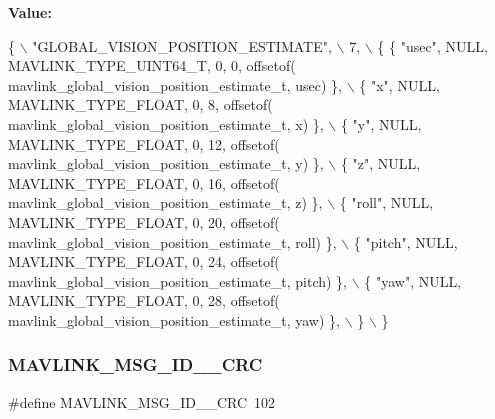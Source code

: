 {\bfseries Value\+:}
\begin{DoxyCode}
\{ \(\backslash\)
    \textcolor{stringliteral}{"GLOBAL\_VISION\_POSITION\_ESTIMATE"}, \(\backslash\)
    7, \(\backslash\)
    \{  \{ \textcolor{stringliteral}{"usec"}, NULL, MAVLINK_TYPE_UINT64_T, 0, 0, offsetof(
      mavlink_global_vision_position_estimate_t, usec) \}, \(\backslash\)
         \{ \textcolor{stringliteral}{"x"}, NULL, MAVLINK_TYPE_FLOAT, 0, 8, offsetof(
      mavlink_global_vision_position_estimate_t, x) \}, \(\backslash\)
         \{ \textcolor{stringliteral}{"y"}, NULL, MAVLINK_TYPE_FLOAT, 0, 12, offsetof(
      mavlink_global_vision_position_estimate_t, y) \}, \(\backslash\)
         \{ \textcolor{stringliteral}{"z"}, NULL, MAVLINK_TYPE_FLOAT, 0, 16, offsetof(
      mavlink_global_vision_position_estimate_t, z) \}, \(\backslash\)
         \{ \textcolor{stringliteral}{"roll"}, NULL, MAVLINK_TYPE_FLOAT, 0, 20, offsetof(
      mavlink_global_vision_position_estimate_t, roll) \}, \(\backslash\)
         \{ \textcolor{stringliteral}{"pitch"}, NULL, MAVLINK_TYPE_FLOAT, 0, 24, offsetof(
      mavlink_global_vision_position_estimate_t, pitch) \}, \(\backslash\)
         \{ \textcolor{stringliteral}{"yaw"}, NULL, MAVLINK_TYPE_FLOAT, 0, 28, offsetof(
      mavlink_global_vision_position_estimate_t, yaw) \}, \(\backslash\)
         \} \(\backslash\)
\}
\end{DoxyCode}
\mbox{\label{mavlink__msg__global__vision__position__estimate_8h_a178d7f3f76db2b0f83c58f65e83a4a96}} 
\subsubsection{M\+A\+V\+L\+I\+N\+K\+\_\+\+M\+S\+G\+\_\+\+I\+D\+\_\+\_\+\+C\+RC}
{\footnotesize\ttfamily \#define M\+A\+V\+L\+I\+N\+K\+\_\+\+M\+S\+G\+\_\+\+I\+D\+\_\+\_\+\+C\+RC~102}

\mbox{\label{mavlink__msg__global__vision__position__estimate_8h_aaf8f11063fae355d4e10217f33b41418}} 
